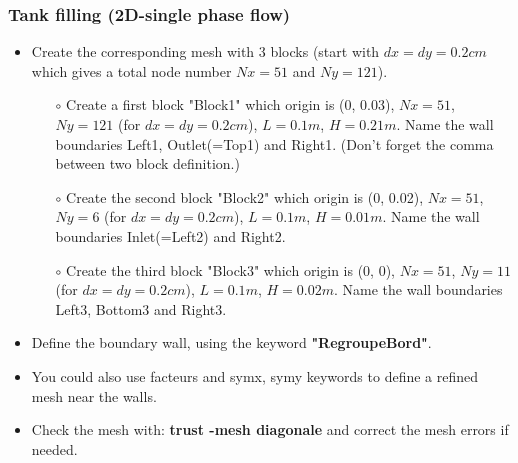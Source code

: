 \documentclass[10pt, hyperref={unicode=true,pdfusetitle, bookmarks=true,bookmarksnumbered=false,bookmarksopen=false, breaklinks=false,pdfborder={0 0 1},backref=true,colorlinks=true,linkcolor=darkblue,pageanchor}]{beamer}
\begin{document}
\begin{frame}
\frametitle{Tank filling (2D-single phase flow)}
\begin{block}{}

\begin{itemize}
\item Create the corresponding mesh with 3 blocks (start with $dx=dy=0.2cm$ which gives a total node number $Nx=51$ and $Ny=121$). 
    \begin{itemize}
    \item [$\circ$] Create a first block "Block1" which origin is (0, 0.03), $Nx=51$, $Ny=121$ (for $dx=dy=0.2cm$), $L=0.1 m$, $H=0.21 m$. Name the wall boundaries Left1, Outlet(=Top1) and Right1. (Don't forget the comma between two block definition.)
    \item [$\circ$] Create the second block "Block2" which origin is (0, 0.02), $Nx=51$, $Ny=6$ (for $dx=dy=0.2cm$), $L=0.1 m$, $H=0.01 m$. Name the wall boundaries Inlet(=Left2) and Right2.
    \item [$\circ$] Create the third block "Block3" which origin is (0, 0), $Nx=51$, $Ny=11$ (for $dx=dy=0.2cm$), $L=0.1 m$, $H=0.02 m$. Name the wall boundaries Left3, Bottom3 and Right3.
    \end{itemize}
\item Define the boundary wall, using the keyword \textbf{"RegroupeBord"}.
\item You could also use facteurs and symx, symy keywords to define a refined mesh near the walls. 
\item Check the mesh with: \textbf{trust -mesh diagonale} and correct the mesh errors if needed.
\end{itemize}

\end{block}
\end{frame}
\end{document}
